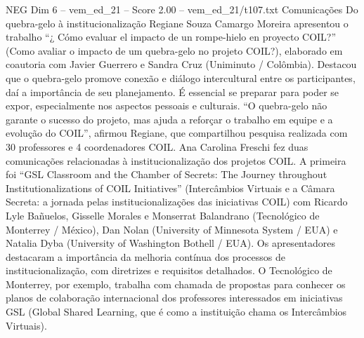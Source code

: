 \begin{textsample}{NEG Dim 6 – vem\_ed\_21 – Score 2.00 – vem\_ed\_21/t107.txt}  \label{ex:f6_neg_040}
Comunicações Do quebra-gelo à institucionalização Regiane Souza Camargo Moreira apresentou o trabalho “¿ Cómo evaluar el impacto de un rompe-hielo en proyecto COIL?” (Como avaliar o impacto de um quebra-gelo no projeto COIL?), elaborado em coautoria com Javier Guerrero e Sandra Cruz (Uniminuto / Colômbia).
Destacou que o quebra-gelo promove conexão e diálogo intercultural entre os participantes, daí a importância de seu planejamento.
É essencial se preparar para poder se expor, especialmente nos aspectos pessoais e culturais. “O quebra-gelo não garante o sucesso do projeto, mas ajuda a reforçar o trabalho em equipe e a evolução do COIL”, afirmou Regiane, que compartilhou pesquisa realizada com 30 professores e 4 coordenadores COIL.
Ana Carolina Freschi fez duas comunicações relacionadas à institucionalização dos projetos COIL.
A primeira foi “GSL Classroom and the Chamber of Secrets: The Journey throughout Institutionalizations of COIL Initiatives” (Intercâmbios Virtuais e a Câmara Secreta: a jornada pelas institucionalizações das iniciativas COIL) com Ricardo Lyle Bañuelos, Gisselle Morales e Monserrat Balandrano (Tecnológico de Monterrey / México), Dan Nolan (University of Minnesota System / EUA) e Natalia Dyba (University of Washington Bothell / EUA).
Os apresentadores destacaram a importância da melhoria contínua dos processos de institucionalização, com diretrizes e requisitos detalhados.
O Tecnológico de Monterrey, por exemplo, trabalha com chamada de propostas para conhecer os planos de colaboração internacional dos professores interessados em iniciativas GSL (Global Shared Learning, que é como a instituição chama os Intercâmbios Virtuais).

\end{textsample}
